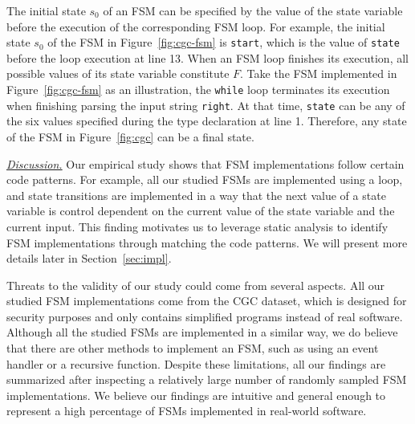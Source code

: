 The initial state $s_0$ of an FSM can be specified
by the value of the state variable before 
the execution of the corresponding 
FSM loop.
For example, the initial state $s_0$ of the FSM in Figure~\ref{fig:cgc-fsm}
is \texttt{start}, which is the value of \texttt{state}
before the loop execution at line 13.
When an FSM loop finishes its execution,
all possible values of its state variable
constitute $F$.
Take the FSM implemented in Figure~\ref{fig:cgc-fsm} as an illustration, 
the \texttt{while} loop terminates its execution when 
finishing parsing the input string \texttt{right}. 
At that time, \texttt{state} can be any of the six values specified
during the type declaration at line 1. 
Therefore, any state of the FSM in
Figure~\ref{fig:cgc} can be a final state.


\noindent\underline{{\textit{Discussion.}}}
Our empirical study shows that FSM implementations follow certain 
code patterns. For example, all our studied FSMs are implemented using a loop, 
and state transitions are implemented in a way that 
the next value of a state variable is control dependent 
on the current value of the state variable 
and the current input. 
This finding motivates us to leverage static analysis to 
identify FSM implementations 
through matching the code patterns. 
We will present more details later in Section~\ref{sec:impl}.

Threats to the validity of our study could come from several aspects. 
All our studied FSM implementations come from the CGC dataset,
which is designed for security purposes and only contains simplified programs 
instead of real software. 
Although all the studied FSMs are implemented in a similar way, 
we do believe that there are other methods to implement an FSM, 
such as using an event handler or a recursive function. 
Despite these limitations, all our findings are summarized 
after inspecting a relatively large number of randomly sampled FSM implementations. 
We believe our findings are intuitive and general enough to represent a high percentage 
of FSMs implemented in real-world software. 










